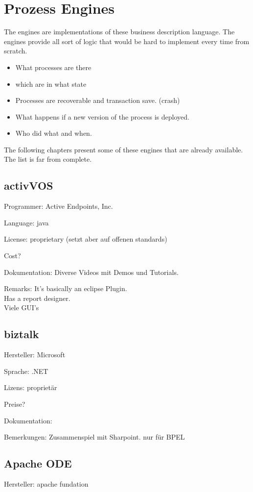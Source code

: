 \documentclass[paper=a4,twoside=false,BCOR=0mm,DIV=calc,fontsize=12pt]{scrartcl}
\begin{document}
\section{Prozess Engines}
The engines are implementations of these business description language. The engines provide all sort of logic that would be hard to implement every time from scratch.
\begin{itemize}
  \item What processes are there
  \item which are in what state
  \item Processes are recoverable and transaction save. (crash)
  \item What happens if a new version of the process is deployed.
  \item Who did what and when.
\end{itemize}


The following chapters present some of these engines that are already available. The list is far from complete.

\subsection{activVOS}
Programmer: Active Endpoints, Inc.

Language: java

License: proprietary (setzt aber auf offenen standards)


Cost?

Dokumentation: Diverse Videos mit Demos und Tutorials.

Remarks: It's basically an eclipse Plugin. \\
Has a report designer. \\
Viele GUI's


\subsection{biztalk}
Hersteller: Microsoft

Sprache: .NET

Lizens: proprietär


Preise?

Dokumentation:

Bemerkungen:
Zusammenspiel mit Sharpoint.
nur für BPEL



\subsection{Apache ODE}
Hersteller: apache fundation
\end{document}
